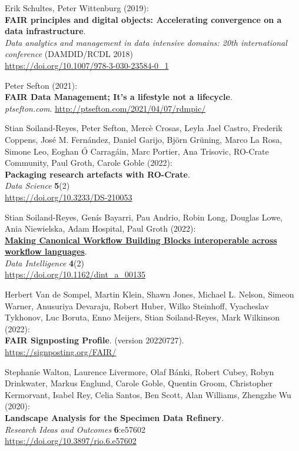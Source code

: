 \begin{thebibliography}{9}
Erik Schultes, Peter Wittenburg (2019):\\
\textbf{FAIR principles and digital objects: Accelerating convergence on
a data infrastructure}.\\
\emph{Data analytics and management in data intensive domains: 20th
international conference} (DAMDID/RCDL 2018)\\
\url{https://doi.org/10.1007/978-3-030-23584-0_1}

Peter Sefton (2021):\\
\textbf{FAIR Data Management; It's a lifestyle not a lifecycle}.\\
\emph{ptsefton.com}. \url{http://ptsefton.com/2021/04/07/rdmpic/}

Stian Soiland-Reyes, Peter Sefton, Mercè
Crosas, Leyla Jael Castro, Frederik Coppens, José M. Fernández, Daniel
Garijo, Björn Grüning, Marco La Rosa, Simone Leo, Eoghan Ó Carragáin,
Marc Portier, Ana Trisovic, RO-Crate Community, Paul Groth, Carole Goble
(2022):\\
\textbf{Packaging research artefacts with RO-Crate}.\\
\emph{Data Science} \textbf{5}(2)\\
\url{https://doi.org/10.3233/DS-210053}

Stian Soiland-Reyes, Genís Bayarri, Pau
Andrio, Robin Long, Douglas Lowe, Ania Niewielska, Adam Hospital, Paul
Groth (2022):\\
\href{../canonical-workflow-building-blocks/}{\textbf{Making Canonical
Workflow Building Blocks interoperable across workflow languages}}.\\
\emph{Data Intelligence} \textbf{4}(2)\\
\url{https://doi.org/10.1162/dint_a_00135}

Herbert Van de Sompel, Martin Klein, Shawn
Jones, Michael L. Nelson, Simeon Warner, Anusuriya Devaraju, Robert
Huber, Wilko Steinhoff, Vyacheslav Tykhonov, Luc Boruta, Enno Meijers,
Stian Soiland-Reyes, Mark Wilkinson (2022):\\
\textbf{FAIR Signposting Profile}. (version 20220727).\\
\url{https://signposting.org/FAIR/}

Stephanie Walton, Laurence Livermore, Olaf Bánki,
Robert Cubey, Robyn Drinkwater, Markus Englund, Carole Goble, Quentin
Groom, Christopher Kermorvant, Isabel Rey, Celia Santos, Ben Scott, Alan
Williams, Zhengzhe Wu (2020):\\
\textbf{Landscape Analysis for the Specimen Data Refinery}.\\
\emph{Research Ideas and Outcomes} \textbf{6}:e57602\\
\url{https://doi.org/10.3897/rio.6.e57602}


\end{thebibliography}
